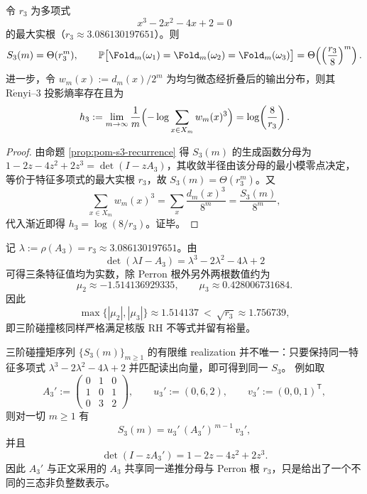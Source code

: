 \begin{corollary}\label{cor:pom-s3-asymptotic}
令 \(r_3\) 为多项式
$$
x^3-2x^2-4x+2=0
$$
的最大实根（\(r_3\approx 3.086130197651\)）。则
$$
S_3(m)=\Theta(r_3^m),
\qquad
\mathbb{P}\bigl[\Fold_m(\omega_1)=\Fold_m(\omega_2)=\Fold_m(\omega_3)\bigr]
=\Theta\!\left(\left(\frac{r_3}{8}\right)^m\right).
$$
进一步，令 \(w_m(x):=d_m(x)/2^m\) 为均匀微态经折叠后的输出分布，则其 \(\mathrm{R\acute{e}nyi}\)--3 投影熵率存在且为
$$
h_3:=\lim_{m\to\infty}\frac{1}{m}\Bigl(-\log\sum_{x\in X_m}w_m(x)^3\Bigr)
=\log\!\left(\frac{8}{r_3}\right).
$$
\end{corollary}
\begin{proof}
由命题 \ref{prop:pom-s3-recurrence} 得 \(S_3(m)\) 的生成函数分母为 \(1-2z-4z^2+2z^3=\det(I-zA_3)\)，其收敛半径由该分母的最小模零点决定，等价于特征多项式的最大实根 \(r_3\)，故 \(S_3(m)=\Theta(r_3^m)\)。又
$$
\sum_{x\in X_m}w_m(x)^3=\sum_x \frac{d_m(x)^3}{8^m}=\frac{S_3(m)}{8^m},
$$
代入渐近即得 \(h_3=\log(8/r_3)\)。证毕。
\end{proof}

\begin{remark}\label{rem:pom-collision-rh-margin-a3}
记 \(\lambda:=\rho(A_3)=r_3\approx 3.086130197651\)。由
\[
\det(\lambda I-A_3)=\lambda^3-2\lambda^2-4\lambda+2
\]
可得三条特征值均为实数，除 Perron 根外另外两根数值约为
\[
\mu_2\approx -1.514136929335,\qquad
\mu_3\approx 0.428006731684.
\]
因此
\[
\max\{|\mu_2|,|\mu_3|\}\approx 1.514137\ <\ \sqrt{r_3}\approx 1.756739,
\]
即三阶碰撞核同样严格满足核版 RH 不等式并留有裕量。
\end{remark}

\begin{remark}\label{rem:pom-a3-alternative-realization}
三阶碰撞矩序列 \(\{S_3(m)\}_{m\ge 1}\) 的有限维 realization 并不唯一：只要保持同一特征多项式
\(
\lambda^3-2\lambda^2-4\lambda+2
\)
并匹配读出向量，即可得到同一 \(S_3\)。
例如取
$$
A_3':=
\begin{pmatrix}
0&1&0\\
1&0&1\\
0&3&2
\end{pmatrix},
\qquad
u_3':=(0,6,2),\qquad
v_3':=(0,0,1)^{\mathsf T},
$$
则对一切 \(m\ge 1\) 有
$$
S_3(m)=u_3' \, (A_3')^{\,m-1}\, v_3',
$$
并且
$$
\det(I-zA_3')=1-2z-4z^2+2z^3.
$$
因此 \(A_3'\) 与正文采用的 \(A_3\) 共享同一递推分母与 Perron 根 \(r_3\)，只是给出了一个不同的三态非负整数表示。
\end{remark}

